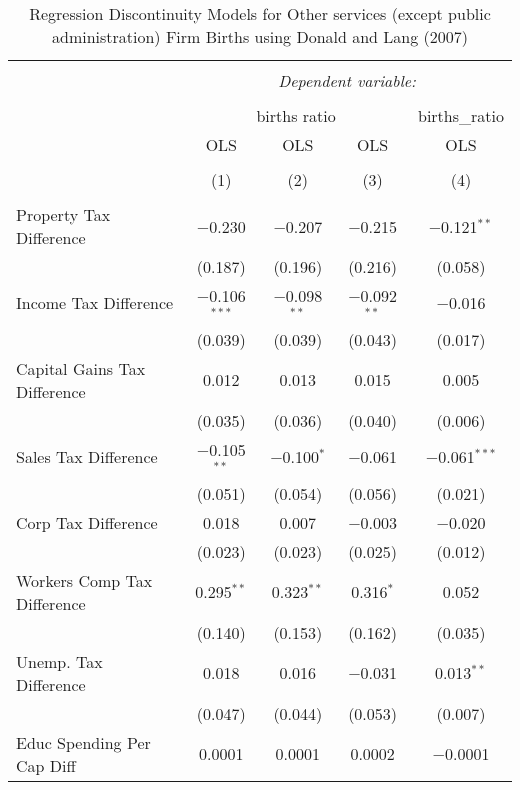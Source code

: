 
\begin{table}[!htbp] \centering 
  \caption{Regression Discontinuity Models for  Other services (except public administration) Firm Births using Donald and Lang (2007)} 
  \label{} 
\begin{tabular}{@{\extracolsep{5pt}}lcccc} 
\\[-1.8ex]\hline 
\hline \\[-1.8ex] 
 & \multicolumn{4}{c}{\textit{Dependent variable:}} \\ 
\cline{2-5} 
\\[-1.8ex] & \multicolumn{3}{c}{births ratio} & births\_ratio \\ 
 & OLS & OLS & OLS & OLS \\ 
\\[-1.8ex] & (1) & (2) & (3) & (4)\\ 
\hline \\[-1.8ex] 
 Property Tax Difference & $-$0.230 & $-$0.207 & $-$0.215 & $-$0.121$^{**}$ \\ 
  & (0.187) & (0.196) & (0.216) & (0.058) \\ 
  Income Tax Difference & $-$0.106$^{***}$ & $-$0.098$^{**}$ & $-$0.092$^{**}$ & $-$0.016 \\ 
  & (0.039) & (0.039) & (0.043) & (0.017) \\ 
  Capital Gains Tax Difference & 0.012 & 0.013 & 0.015 & 0.005 \\ 
  & (0.035) & (0.036) & (0.040) & (0.006) \\ 
  Sales Tax Difference & $-$0.105$^{**}$ & $-$0.100$^{*}$ & $-$0.061 & $-$0.061$^{***}$ \\ 
  & (0.051) & (0.054) & (0.056) & (0.021) \\ 
  Corp Tax Difference & 0.018 & 0.007 & $-$0.003 & $-$0.020 \\ 
  & (0.023) & (0.023) & (0.025) & (0.012) \\ 
  Workers Comp Tax Difference & 0.295$^{**}$ & 0.323$^{**}$ & 0.316$^{*}$ & 0.052 \\ 
  & (0.140) & (0.153) & (0.162) & (0.035) \\ 
  Unemp. Tax Difference & 0.018 & 0.016 & $-$0.031 & 0.013$^{**}$ \\ 
  & (0.047) & (0.044) & (0.053) & (0.007) \\ 
  Educ Spending Per Cap Diff & 0.0001 & 0.0001 & 0.0002 & $-$0.0001 \\ 

\end{tabular}
\end{table}

